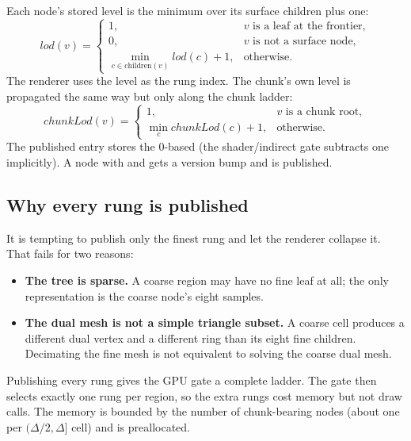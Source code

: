 Each node's stored level is the minimum over its surface children plus one:
\begin{equation}
  lod(v) =
  \begin{cases}
    1, & v \text{ is a leaf at the frontier},\\
    0, & v \text{ is not a surface node},\\
    \min_{c\in\text{children}(v)} lod(c) + 1, & \text{otherwise}.
  \end{cases}
\end{equation}
The renderer uses the level as the rung index.  The chunk's own level is
propagated the same way but only along the chunk ladder:
\begin{equation}
  chunkLod(v) =
  \begin{cases}
    1, & v \text{ is a chunk root},\\
    \min_{c} chunkLod(c)+1, & \text{otherwise}.
  \end{cases}
\end{equation}
The published entry stores the 0-based  (the shader/indirect gate
subtracts one implicitly).  A node with  and
 gets a version bump and is published.

\subsection{Why every rung is published}

It is tempting to publish only the finest rung and let the renderer collapse
it.  That fails for two reasons:

\begin{itemize}
\item \textbf{The tree is sparse.}  A coarse region may have no fine leaf at
  all; the only representation is the coarse node's eight samples.
\item \textbf{The dual mesh is not a simple triangle subset.}  A coarse cell
  produces a different dual vertex and a different ring than its eight
  fine children.  Decimating the fine mesh is not equivalent to solving the
  coarse dual mesh.
\end{itemize}

Publishing every rung gives the GPU gate a complete ladder.  The gate then
selects exactly one rung per region, so the extra rungs cost memory but not
draw calls.  The memory is bounded by the number of chunk-bearing nodes
(about one per $(\Delta/2,\Delta]$ cell) and is preallocated.

